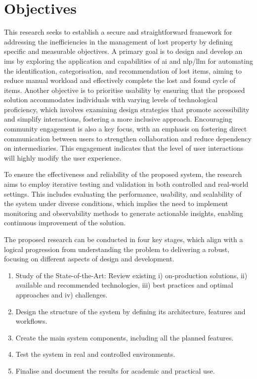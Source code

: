 \section{Objectives}

This research seeks to establish a secure and straightforward framework for addressing the inefficiencies in the management of lost property by defining specific and measurable objectives.
A primary goal is to design and develop an \ac{ims} by exploring the application and capabilities of \ac{ai} and \ac{nlp}/\ac{llm} for automating the identification, categorisation, and recommendation of lost items, aiming to reduce manual workload and effectively complete the lost and found cycle of items. %
Another objective is to prioritise usability by ensuring that the proposed solution accommodates individuals with varying levels of technological proficiency, which involves examining design strategies that promote accessibility and simplify interactions, fostering a more inclusive approach.
Encouraging community engagement is also a key focus, with an emphasis on fostering direct communication between users to strengthen collaboration and reduce dependency on intermediaries.
This engagement indicates that the level of user interactions will highly modify the user experience.

To ensure the effectiveness and reliability of the proposed system, the research aims to employ iterative testing and validation in both controlled and real-world settings.
This includes evaluating the performance, usability, and scalability of the system under diverse conditions, which implies the need to implement monitoring and observability methods to generate actionable insights, enabling continuous improvement of the solution.

The proposed research can be conducted in four key stages, which align with a logical progression from understanding the problem to delivering a robust, focusing on different aspects of design and development.

\begin{enumerate}
    \item Study of the State-of-the-Art: Review existing i) on-production solutions, ii) available and recommended technologies, iii) best practices and optimal approaches and iv) challenges.
    \item Design the structure of the system by defining its architecture, features and workflows.
    \item Create the main system components, including all the planned features.
    \item Test the system in real and controlled environments.
    \item Finalise and document the results for academic and practical use.
\end{enumerate}

